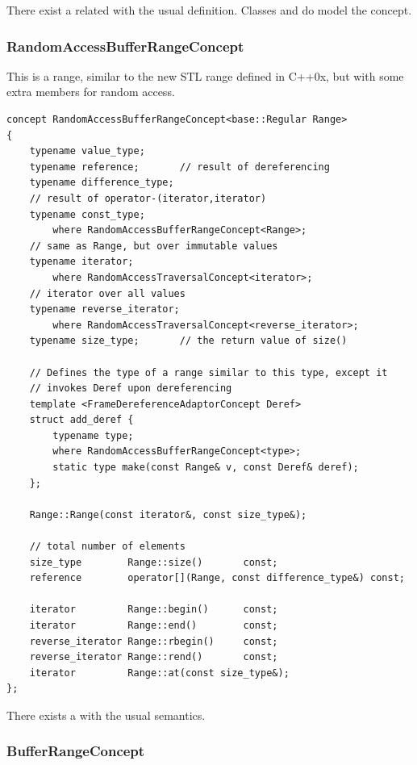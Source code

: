 There exist a related  with the
usual definition. Classes  and
 do model the concept.

\subsubsection{RandomAccessBufferRangeConcept}

This is a range, similar to the new STL range defined in C++0x, but
with some extra members for random access.

\begin{lstlisting}
concept RandomAccessBufferRangeConcept<base::Regular Range> 
{
    typename value_type;
    typename reference;       // result of dereferencing
    typename difference_type;
    // result of operator-(iterator,iterator)
    typename const_type; 
        where RandomAccessBufferRangeConcept<Range>;
    // same as Range, but over immutable values
    typename iterator; 
        where RandomAccessTraversalConcept<iterator>;
    // iterator over all values
    typename reverse_iterator;
        where RandomAccessTraversalConcept<reverse_iterator>; 
    typename size_type;       // the return value of size()

    // Defines the type of a range similar to this type, except it
    // invokes Deref upon dereferencing
    template <FrameDereferenceAdaptorConcept Deref>
    struct add_deref {
        typename type;
        where RandomAccessBufferRangeConcept<type>;
        static type make(const Range& v, const Deref& deref);
    };
    
    Range::Range(const iterator&, const size_type&);
    
    // total number of elements
    size_type        Range::size()       const; 
    reference        operator[](Range, const difference_type&) const;
    
    iterator         Range::begin()      const;
    iterator         Range::end()        const;
    reverse_iterator Range::rbegin()     const;
    reverse_iterator Range::rend()       const;
    iterator         Range::at(const size_type&);
};
\end{lstlisting}

There exists a  with the usual
semantics.

\subsubsection{BufferRangeConcept}

